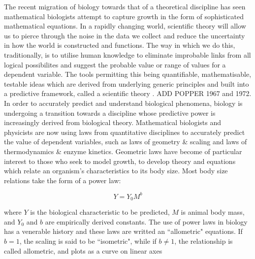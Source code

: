 \documentclass[a4paper]{article} %
\begin{document}
        The recent migration of biology towards that of a theoretical discipline has seen mathematical biologists attempt to capture growth in the form of sophisticated mathematical equations. In a rapidly changing world, scientific theory will allow us to pierce through the noise in the data we collect and reduce the uncertainty in how the world is constructed and functions. The way in which we do this, traditionally, is to utilise human knowledge to eliminate improbable links from all logical possibilites and suggest the probable value or range of values for a dependent variable. The tools permitting this being quantifiable, mathematisable, testable ideas which are derived from underlying generic principles and built into a predictive framework, called a scientific theory \cite{peters1983, West2011}. ADD POPPER 1967 and 1972. In order to accurately predict and understand biological phenomena, biology is undergoing a transition towards a discipline whose predictive power is increasingly derived from  biological theory. Mathematical biologists and physicists are now using laws from quantitative disciplines to accurately predict the value of dependent variables, such as laws of geometry \& scaling and laws of thermodynamics \& enzyme kinetics. Geometric laws have become of particular interest to those who seek to model growth, to develop theory and equations which relate an organism's characteristics to its body size. Most body size relations take the form of a power law:

        \begin{equation}
            Y = Y_0 M^b
        \end{equation}

        where $Y$ is the biological characteristic to be predicted, $M$ is animal body mass, and $Y_0$ and $b$ are empirically derived constants. The use of power laws in biology has a venerable history and these laws are writted an ``allometric" equations. If $b = 1$, the scaling is said to be ``isometric", while if $b \neq 1$, the relationship is called allometric, and plots as a curve on linear axes \autocite{brown2000-scaling-book}
\end{document}
